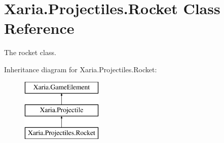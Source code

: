\hypertarget{classXaria_1_1Projectiles_1_1Rocket}{}\section{Xaria.\+Projectiles.\+Rocket Class Reference}
\label{classXaria_1_1Projectiles_1_1Rocket}


The rocket class.  


Inheritance diagram for Xaria.\+Projectiles.\+Rocket\+:\begin{figure}[H]
\begin{center}
\leavevmode
\includegraphics[height=3.000000cm]{classXaria_1_1Projectiles_1_1Rocket}
\end{center}
\end{figure}
